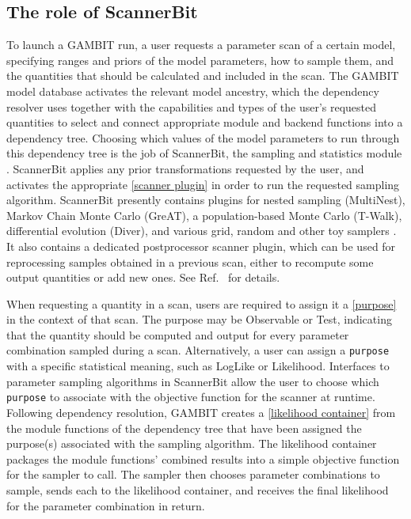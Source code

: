 \documentclass[pdftex,twocolumn,epjc3_preprint,runningheads]{svjour3}
\renewcommand{\_}{\discretionary{\underscore}{}{\underscore}}
\newcommand\yaml[1]{{\lstset{style=yaml}\lstinline!#1!\lstset{style=cpp}}}
\newcommand\yamlvalue[1]{{\YAMLvaluestyle\ttfamily#1}}
\newcommand\YAMLvaluestyle{\footnotesize\color{blue}\mdseries}
\newcommand{\cross}[1]{\ref{#1}}
\newcommand{\gambit}{\textsf{GAMBIT}\xspace}
\newcommand{\scannerbit}{\textsf{ScannerBit}\xspace}
\newcommand{\GB}{\gambit}
\newcommand\MultiNest{\textsf{MultiNest}\xspace}
\newcommand\multinest{\MultiNest}
\newcommand\great{\textsf{GreAT}\xspace}
\newcommand\twalk{\textsf{T-Walk}\xspace}
\newcommand\diver{\textsf{Diver}\xspace}
\begin{document}
\subsection{The role of \scannerbit}
\label{stats:strategy}

To launch a \GB run, a user requests a parameter scan of a certain model, specifying ranges and priors of the model parameters, how to sample them, and the quantities that should be calculated and included in the scan.  The \GB model database activates the relevant model ancestry, which the dependency resolver uses together with the capabilities and types of the user's requested quantities to select and connect appropriate module and backend functions into a dependency tree.  Choosing which values of the model parameters to run through this dependency tree is the job of \scannerbit, the sampling and statistics module \cite{ScannerBit}.  \scannerbit applies any prior transformations requested by the user, and activates the appropriate \cross{scanner plugin} in order to run the requested sampling algorithm.  \scannerbit presently contains plugins for nested sampling (\multinest \cite{MultiNest}), Markov Chain Monte Carlo (\great \cite{GreAT}), a population-based Monte Carlo (\twalk \cite{ScannerBit}), differential evolution (\diver \cite{ScannerBit}), and various grid, random and other toy samplers \cite{ScannerBit}.  It also contains a dedicated \textsf{postprocessor} scanner plugin, which can be used for reprocessing samples obtained in a previous scan, either to recompute some output quantities or add new ones. See Ref.\ \cite{ScannerBit} for details.

When requesting a quantity in a scan, users are required to assign it a \cross{purpose} in the context of that scan.  The purpose may be \yamlvalue{Observable} or \mbox{\yamlvalue{Test},} indicating that the quantity should be computed and output for every parameter combination sampled during a scan.  Alternatively, a user can assign a \yaml{purpose} with a specific statistical meaning, such as \yamlvalue{LogLike} or \yamlvalue{Likelihood}.  Interfaces to parameter sampling algorithms in \scannerbit allow the user to choose which \yaml{purpose} to associate with the objective function for the scanner at runtime. Following dependency resolution, \GB creates a \cross{likelihood container} from the module functions of the dependency tree that have been assigned the purpose(s) associated with the sampling algorithm.  The likelihood container packages the module functions' combined results into a simple objective function for the sampler to call.  The sampler then chooses parameter combinations to sample, sends each to the likelihood container, and receives the final likelihood for the parameter combination in return.
\end{document}
